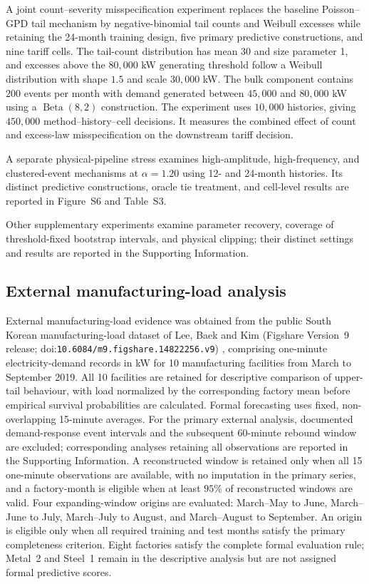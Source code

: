 \documentclass[Times1COL]{WileyNJDv5}
\begin{document}
A joint count--severity misspecification experiment replaces the
baseline Poisson--GPD tail mechanism by negative-binomial tail counts
and Weibull excesses while retaining the 24-month training design,
five primary predictive constructions, and nine tariff cells.
The tail-count distribution has mean 30 and size parameter 1, and
excesses above the $80{,}000$ kW generating threshold follow a
Weibull distribution with shape $1.5$ and scale $30{,}000$ kW.
The bulk component contains 200 events per month with demand generated
between $45{,}000$ and $80{,}000$ kW using a
$\operatorname{Beta}(8,2)$ construction. The experiment uses
$10{,}000$ histories, giving $450{,}000$ method--history--cell
decisions. It measures the combined effect of count and excess-law
misspecification on the downstream tariff decision.

A separate physical-pipeline stress examines high-amplitude,
high-frequency, and clustered-event mechanisms at $\alpha=1.20$
using 12- and 24-month histories. Its distinct predictive
constructions, oracle tie treatment, and cell-level results are
reported in Figure~S6 and Table~S3.

Other supplementary experiments examine parameter recovery,
coverage of threshold-fixed bootstrap intervals, and physical clipping;
their distinct settings and results are reported in the Supporting
Information.

\subsection{External manufacturing-load analysis}
\label{sec:external-manufacturing}

\begin{sloppypar}
External manufacturing-load evidence was obtained from the public South Korean manufacturing-load dataset of Lee, Baek and Kim \cite{Lee2022KoreanFactories} (Figshare Version~9 release; doi:\nolinkurl{10.6084/m9.figshare.14822256.v9}) \cite{LeeFigshareV9}, comprising one-minute electricity-demand records in kW for 10 manufacturing facilities from March to September 2019. All 10 facilities are retained for descriptive comparison of upper-tail behaviour, with load normalized by the corresponding factory mean before empirical survival probabilities are calculated. Formal forecasting uses fixed, non-overlapping 15-minute averages. For the primary external analysis, documented demand-response event intervals and the subsequent 60-minute rebound window are excluded; corresponding analyses retaining all observations are reported in the Supporting Information. A reconstructed window is retained only when all 15 one-minute observations are available, with no imputation in the primary series, and a factory-month is eligible when at least $95\%$ of reconstructed windows are valid. Four expanding-window origins are evaluated: March--May to June, March--June to July, March--July to August, and March--August to September. An origin is eligible only when all required training and test months satisfy the primary completeness criterion. Eight factories satisfy the complete formal evaluation rule; Metal~2 and Steel~1 remain in the descriptive analysis but are not assigned formal predictive scores.
\end{sloppypar}
\end{document}
